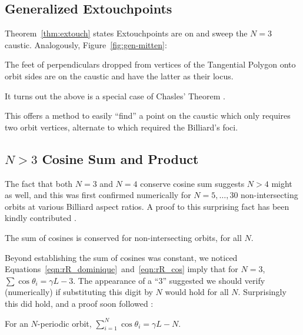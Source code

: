 \subsection{Generalized Extouchpoints}

Theorem~\ref{thm:extouch} states Extouchpoints are on and sweep the $N=3$ caustic. Analogously, Figure~\ref{fig:gen-mitten}:

\begin{theorem}
The feet of perpendiculars dropped from vertices of the Tangential Polygon onto orbit sides are on the caustic and have the latter as their locus.
\end{theorem}

It turns out the above is a special case of Chasles' Theorem \cite{sergei2016proj}. 

This offers a method to easily ``find'' a point on the caustic which only requires two orbit vertices, alternate to \cite{himmelstrand12} which required the Billiard's foci.

\subsection{$N>3$ Cosine Sum and Product}

The fact that both $N=3$ and $N=4$ conserve cosine sum suggests $N>4$ might as well, and this was first confirmed numerically for $N=5,\ldots,30$ non-intersecting orbits at various Billiard aspect ratios. A proof to this surprising fact has been kindly contributed \cite{sergei19_private_meromorphic}.

\begin{theorem}
The sum of cosines is conserved for non-intersecting orbits, for all $N$. %
\label{thm:cosine-sum-meromorphic}
\end{theorem}

\noindent Beyond establishing the sum of cosines was constant, we noticed Equations~\ref{eqn:rR_dominique}~and~\ref{eqn:rR_cos} imply that for $N=3$, $\sum{\cos\theta_i}=\gamma{L}-3$. The appearance of a ``$3$'' suggested we should verify (numerically) if substituting this digit by $N$ would hold for all $N$. Surprisingly this did hold, and a proof soon followed \cite{sergei19_private_cosine_sum_expression}:

\begin{theorem}
For an $N$-periodic orbit, $\sum_{i=1}^{N}{\cos\theta_i}=\gamma{L}-N$.
\label{thm:cosine-sum}
\end{theorem}

